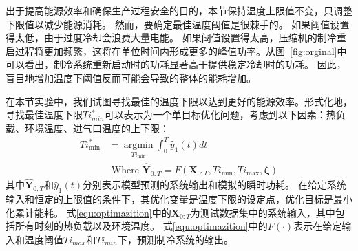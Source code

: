 出于提高能源效率和确保生产过程安全的目的，本节保持温度上限值不变，只调整下限值以减少能源消耗。
然而，要确定最佳温度阈值是很棘手的。
如果阈值设置得太低，由于过度冷却会浪费大量电能。
如果阈值设置得太高，压缩机的制冷重启过程将更加频繁，这将在单位时间内形成更多的峰值功率。从图~\ref{fig:orginal}中可以看出，制冷系统重新启动时的功耗显著高于提供稳定冷却时的功耗。
因此，盲目地增加温度下阈值反而可能会导致的整体的能耗增加。

在本节实验中，我们试图寻找最佳的温度下限以达到更好的能源效率。形式化地，寻找最佳温度下限$Ti_{min}^{*}$可以表示为一个单目标优化问题，考虑到以下因素：热负载、环境温度、进气口温度的上下限：
\begin{equation}
    \begin{aligned}
       Ti^*_{\min}&=\mathop{\arg\min}\limits_{Ti_{\min}} \int_{0}^{T} \hat{y}_{1}(t) dt \\
       &\text{ Where } \hat{\boldsymbol{Y}}_{0: T}=F\left(\boldsymbol{X}_{0: T},Ti_{\min}, Ti_{\max},\boldsymbol{\zeta}\right)
    \end{aligned}
    \label{equ:optimazition}
    \end{equation}
其中$\hat{\boldsymbol{Y}}_{0: T}$和$\hat{y}_{1}(t)$分别表示模型预测的系统输出和模拟的瞬时功耗。
在给定系统输入和恒定的上限值的条件下，其优化变量是温度下限的设定点，优化目标是最小化累计能耗。
式\eqref{equ:optimazition}中的$\boldsymbol{X}_{0: T}$为测试数据集中的系统输入，其中包括所有时刻的热负载以及环境温度。
式\eqref{equ:optimazition}中的$F(\cdot)$表示在给定输入和温度阈值$Ti_{max}$和$Ti_{min}$下，预测制冷系统的输出。

